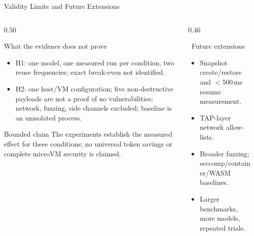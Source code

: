 \documentclass[aspectratio=169,11pt]{beamer}
\begin{document}
\begin{frame}{Validity Limits and Future Extensions}
  \scriptsize
  \begin{columns}[T,totalwidth=\textwidth]
    \begin{column}{0.50\textwidth}
      \begin{alertblock}{What the evidence does not prove}
        \begin{itemize}
          \item H1: one model, one measured run per condition, two reuse
            frequencies; exact break-even not identified.
          \item H2: one host/VM configuration; five non-destructive payloads
            are not a proof of no vulnerabilities; network, fuzzing, side
            channels excluded; baseline is an unisolated process.
        \end{itemize}
      \end{alertblock}
      \vspace{0.15cm}
      \begin{exampleblock}{Bounded claim}
        The experiments establish the measured effect for these conditions;
        no universal token savings or complete microVM security is claimed.
      \end{exampleblock}
    \end{column}
    \begin{column}{0.46\textwidth}
      \begin{block}{\faHourglassHalf\ Future extensions}
        \begin{itemize}
          \item Snapshot create/restore and $<500$\,ms resume measurement.
          \item TAP-layer network allow-lists.
          \item Broader fuzzing; seccomp/container/WASM baselines.
          \item Larger benchmarks, more models, repeated trials.
        \end{itemize}
      \end{block}
    \end{column}
  \end{columns}
\end{frame}
\end{document}
